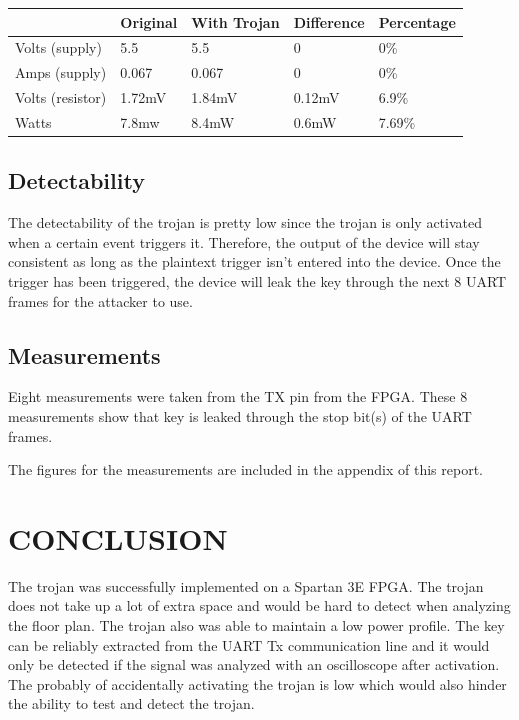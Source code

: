 \documentclass[letterpaper, 10 pt, conference]{ieeeconf}  %
\begin{document}
 \begin{center}
    \begin{tabular}{| l | l | l | l | l |}
        \hline
        & Original & With Trojan & Difference & Percentage \\ \hline
        Volts (supply) & 5.5 & 5.5 & 0 & 0\% \\ \hline
        Amps (supply) & 0.067 & 0.067 & 0 & 0\% \\ \hline
        Volts (resistor) & 1.72mV & 1.84mV & 0.12mV & 6.9\% \\
        Watts & 7.8mw & 8.4mW & 0.6mW & 7.69\% \\
        \hline
    \end{tabular}
\end{center}

\subsection{Detectability}

The detectability of the trojan is pretty low since the trojan is only activated when a certain event triggers it. Therefore, the output of the device will stay consistent as long as the plaintext trigger isn't entered into the device. Once the trigger has been triggered, the device will leak the key through the next 8 UART frames for the attacker to use.

\subsection{Measurements} 

Eight measurements were taken from the TX pin from the FPGA. These 8 measurements show that key is leaked through the stop bit(s) of the UART frames. 

The figures for the measurements are included in the appendix of this report.

\section{CONCLUSION}

The trojan was successfully implemented on a Spartan 3E FPGA.  The trojan does not take up a lot of extra space and would be hard to detect when analyzing the floor plan.  The trojan also was able to maintain a low power profile.  The key can be reliably extracted from the UART Tx communication line and it would only be detected if the signal was analyzed with an oscilloscope after activation.  The probably of accidentally activating the trojan is low which would also hinder the ability to test and detect the trojan.
\end{document}
